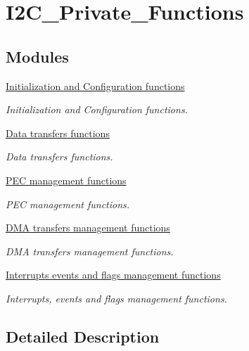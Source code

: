 \hypertarget{group___i2_c___private___functions}{\section{I2\-C\-\_\-\-Private\-\_\-\-Functions}
\label{group___i2_c___private___functions}
}
\subsection*{Modules}
\begin{DoxyCompactItemize}
\item 
\hyperlink{group___i2_c___group1}{Initialization and Configuration functions}
\begin{DoxyCompactList}\small\item\em Initialization and Configuration functions. \end{DoxyCompactList}\item 
\hyperlink{group___i2_c___group2}{Data transfers functions}
\begin{DoxyCompactList}\small\item\em Data transfers functions. \end{DoxyCompactList}\item 
\hyperlink{group___i2_c___group3}{P\-E\-C management functions}
\begin{DoxyCompactList}\small\item\em P\-E\-C management functions. \end{DoxyCompactList}\item 
\hyperlink{group___i2_c___group4}{D\-M\-A transfers management functions}
\begin{DoxyCompactList}\small\item\em D\-M\-A transfers management functions. \end{DoxyCompactList}\item 
\hyperlink{group___i2_c___group5}{Interrupts events and flags management functions}
\begin{DoxyCompactList}\small\item\em Interrupts, events and flags management functions. \end{DoxyCompactList}\end{DoxyCompactItemize}


\subsection{Detailed Description}
